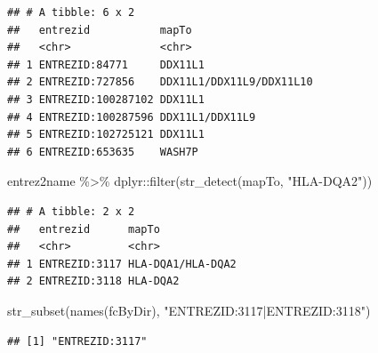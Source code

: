 \documentclass[9pt,a4paper,]{extarticle}
\newenvironment{Shaded}{\begin{snugshade}}{\end{snugshade}}
\newcommand{\FunctionTok}[1]{\textcolor[rgb]{0.00,0.00,0.00}{#1}}
\newcommand{\NormalTok}[1]{#1}
\newcommand{\SpecialCharTok}[1]{\textcolor[rgb]{0.00,0.00,0.00}{#1}}
\newcommand{\StringTok}[1]{\textcolor[rgb]{0.31,0.60,0.02}{#1}}
\begin{document}
\begin{verbatim}
## # A tibble: 6 x 2
##   entrezid           mapTo                   
##   <chr>              <chr>                   
## 1 ENTREZID:84771     DDX11L1                 
## 2 ENTREZID:727856    DDX11L1/DDX11L9/DDX11L10
## 3 ENTREZID:100287102 DDX11L1                 
## 4 ENTREZID:100287596 DDX11L1/DDX11L9         
## 5 ENTREZID:102725121 DDX11L1                 
## 6 ENTREZID:653635    WASH7P
\end{verbatim}

\begin{Shaded}
\begin{Highlighting}[]
\NormalTok{entrez2name }\SpecialCharTok{\%\textgreater{}\%}
\NormalTok{    dplyr}\SpecialCharTok{::}\FunctionTok{filter}\NormalTok{(}\FunctionTok{str\_detect}\NormalTok{(mapTo, }\StringTok{"HLA{-}DQA2"}\NormalTok{))}
\end{Highlighting}
\end{Shaded}

\begin{verbatim}
## # A tibble: 2 x 2
##   entrezid      mapTo            
##   <chr>         <chr>            
## 1 ENTREZID:3117 HLA-DQA1/HLA-DQA2
## 2 ENTREZID:3118 HLA-DQA2
\end{verbatim}

\begin{Shaded}
\begin{Highlighting}[]
\FunctionTok{str\_subset}\NormalTok{(}\FunctionTok{names}\NormalTok{(fcByDir), }\StringTok{"ENTREZID:3117|ENTREZID:3118"}\NormalTok{)}
\end{Highlighting}
\end{Shaded}

\begin{verbatim}
## [1] "ENTREZID:3117"
\end{verbatim}
\end{document}

